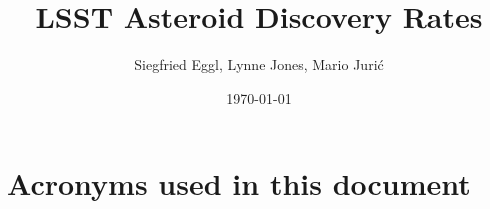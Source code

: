 \documentclass[DM,authoryear,toc]{/Users/eggl/Documents/UW2018/mpc/doc/lsst-texmf/texmf/tex/latex/lsst/lsstdoc}
\title{LSST Asteroid Discovery Rates}
\author{%
Siegfried Eggl,  Lynne Jones, Mario Jurić
}
\date{\today}
\begin{document}

\mkshorttitle




\appendix


\section{Acronyms used in this document}\label{sec:acronyms}

\end{document}
